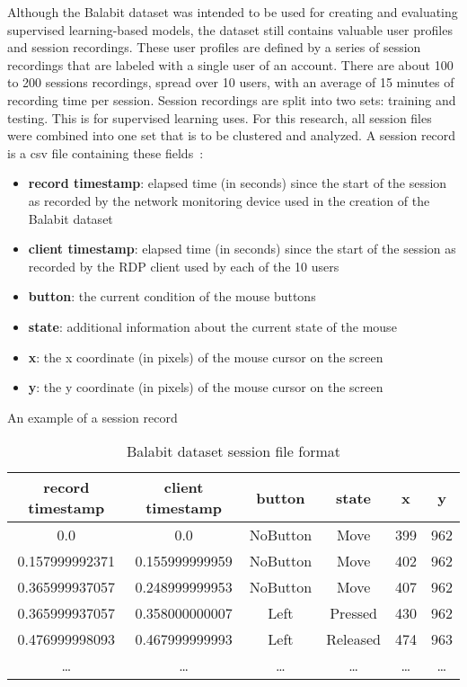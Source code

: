 Although the Balabit dataset was intended to be used for creating and evaluating supervised learning-based models, the dataset still contains valuable user profiles and session recordings.
These user profiles are defined by a series of session recordings that are labeled with a single user of an account.
There are about 100 to 200 sessions recordings, spread over 10 users, with an average of 15 minutes of recording time per session.
Session recordings are split into two sets: training and testing.
This is for supervised learning uses.
For this research, all session files were combined into one set that is to be clustered and analyzed.
A session record is a csv file containing these fields~\cite{balabit_dataset}:
\begin{itemize}
    \item \textbf{record timestamp}: elapsed time (in seconds) since the start of the session as recorded by the network monitoring device used in the creation of the Balabit dataset
    \item \textbf{client timestamp}: elapsed time (in seconds) since the start of the session as recorded by the RDP client used by each of the 10 users
    \item \textbf{button}: the current condition of the mouse buttons
    \item \textbf{state}: additional information about the current state of the mouse
    \item \textbf{x}: the x coordinate (in pixels) of the mouse cursor on the screen
    \item \textbf{y}: the y coordinate (in pixels) of the mouse cursor on the screen
\end{itemize}
\begin{table}
    \centering
    \caption{Balabit dataset session file format}
    {\small An example of a session record}
    \bigskip
    \label{tab:balabit-dataset-format}
    \begin{tabular}{ |c|c|c|c|c|c| }
        \hline
        \textbf{record timestamp} & \textbf{client timestamp} & \textbf{button} & \textbf{state} & \textbf{x} & \textbf{y} \\
        \hline
        0.0 & 0.0 & NoButton & Move & 399 & 962 \\
        0.157999992371 & 0.155999999959 & NoButton & Move & 402 & 962 \\
        0.365999937057 & 0.248999999953 & NoButton & Move & 407 & 962 \\
        0.365999937057 & 0.358000000007 & Left & Pressed & 430 & 962 \\
        0.476999998093 & 0.467999999993 & Left & Released & 474 & 963 \\
        \ldots & \ldots & \ldots & \ldots & \ldots & \ldots \\
        \hline
    \end{tabular}
\end{table}

